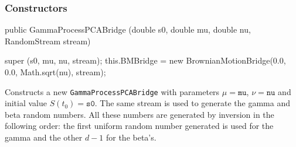 \subsubsection* {Constructors}
\begin{code}

   public GammaProcessPCABridge (double s0, double mu, double nu,
                                 RandomStream stream)\begin{hide} {
        super (s0, mu, nu,  stream);
        this.BMBridge = new BrownianMotionBridge(0.0, 0.0, Math.sqrt(nu), stream);
    }\end{hide}
\end{code}
\begin{tabb} Constructs a new \texttt{GammaProcessPCABridge} with parameters
$\mu = \texttt{mu}$, $\nu = \texttt{nu}$ and initial value $S(t_{0}) = \texttt{s0}$.
The same stream is used to generate the gamma and beta random numbers.  All
these numbers are generated by inversion in the following order:
the first uniform random number generated
is used for the gamma and the other $d-1$ for the beta's.

\end{tabb}

